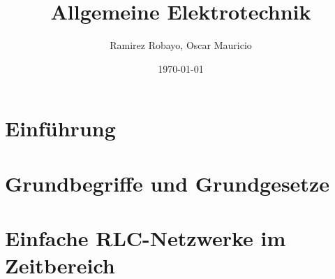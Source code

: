\documentclass[10pt, a4paper]{report}
\title{Allgemeine Elektrotechnik}
\author{Ramirez Robayo, Oscar Mauricio}
\date{\today}
\begin{document}



\chapter{Einführung}

\chapter{Grundbegriffe und Grundgesetze}

\chapter{Einfache RLC-Netzwerke im Zeitbereich}

\end{document}
